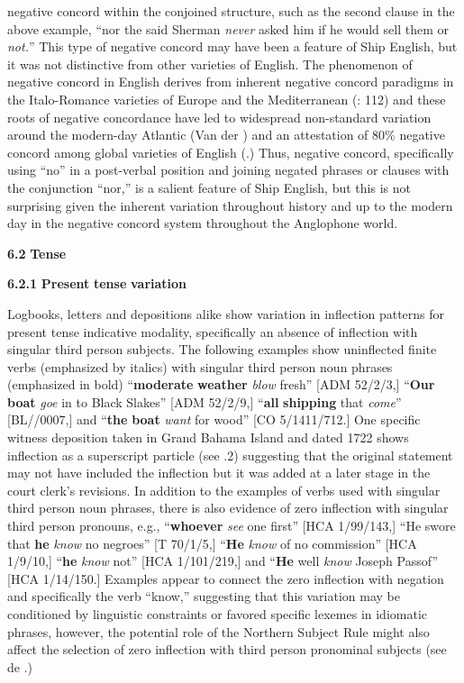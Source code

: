 negative concord within the conjoined structure, such as the second clause in the above example, “nor the said Sherman \textit{never} asked him if he would sell them or \textit{not.}” This type of negative concord may have been a feature of Ship English, but it was not distinctive from other varieties of English. The phenomenon of negative concord in English derives from inherent negative concord paradigms in the Italo-Romance varieties of Europe and the Mediterranean (\citealt{WillisEtAl2013}: 112) and these roots of negative concordance have led to widespread non-standard variation around the modern-day Atlantic (Van der \citealt{Auwera2016}) and an attestation of 80\% negative concord among global varieties of English (\citealt{KortmannLunkenheimer2013}.) Thus, negative concord, specifically using “no” in a post-verbal position and joining negated phrases or clauses with the conjunction “nor,” is a salient feature of Ship English, but this is not surprising given the inherent variation throughout history and up to the modern day in the negative concord system throughout the Anglophone world.  

\textbf{6.2} \textbf{Tense}

  \textbf{6.2.1} \textbf{Present} \textbf{tense} \textbf{variation} 

  Logbooks, letters and depositions alike show variation in inflection patterns for present tense indicative modality, specifically an absence of inflection with singular third person subjects. The following examples show uninflected finite verbs (emphasized by italics) with singular third person noun phrases (emphasized in bold) “\textbf{moderate} \textbf{weather} \textit{blow} fresh” [ADM 52/2/3,] “\textbf{Our} \textbf{boat} \textit{goe} in to Black Slakes” [ADM 52/2/9,] “\textbf{all} \textbf{shipping} that \textit{come}” [BL/\citealt{Egerton2395}/0007,] and “\textbf{the} \textbf{boat} \textit{want} for wood” [CO 5/1411/712.] One specific witness deposition taken in Grand Bahama Island and dated 1722 shows inflection as a superscript particle (see .2) suggesting that the original statement may not have included the inflection but it was added at a later stage in the court clerk’s revisions. In addition to the examples of verbs used with singular third person noun phrases, there is also evidence of zero inflection with singular third person pronouns, e.g., “\textbf{whoever} \textit{see} one first” [HCA 1/99/143,] “He swore that \textbf{he} \textit{know} no negroes” [T 70/1/5,] “\textbf{He} \textit{know} of no commission” [HCA 1/9/10,] “\textbf{he} \textit{know} not” [HCA 1/101/219,] and “\textbf{He} well \textit{know} Joseph Passof” [HCA 1/14/150.] Examples appear to connect the zero inflection with negation and specifically the verb “know,” suggesting that this variation may be conditioned by linguistic constraints or favored specific lexemes in idiomatic phrases, however, the potential role of the Northern Subject Rule might also affect the selection of zero inflection with third person pronominal subjects (see de \citealt{Haas2006}.) 

